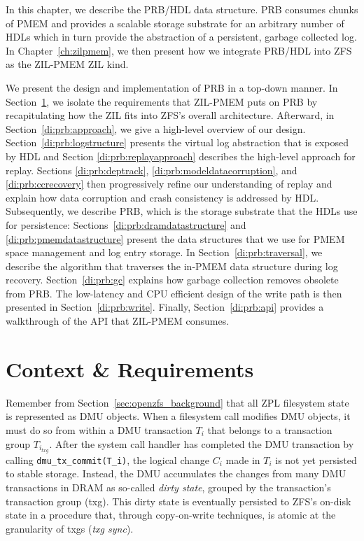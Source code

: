 \documentclass[12pt,a4paper,twoside]{book}
\begin{document}
{In this chapter, we describe the PRB/HDL data structure.
PRB consumes chunks of PMEM and provides a scalable storage substrate for an arbitrary number of HDLs which in turn provide the abstraction of a persistent, garbage collected log.
In Chapter~\ref{ch:zilpmem}, we then present how we integrate PRB/HDL into ZFS as the ZIL-PMEM ZIL kind.

We present the design and implementation of PRB in a top-down manner.
In Section~\ref{di:prb:analysis}, we isolate the requirements that ZIL-PMEM puts on PRB by recapitulating how the ZIL fits into ZFS's overall architecture.
Afterward, in Section~\ref{di:prb:approach}, we give a high-level overview of our design.
Section~\ref{di:prb:logstructure} presents the virtual log abstraction that is exposed by HDL and Section \ref{di:prb:replayapproach} describes the high-level approach for replay.
Sections \ref{di:prb:deptrack}, \ref{di:prb:modeldatacorruption}, and \ref{di:prb:ccrecovery} then progressively refine our understanding of replay and explain how data corruption and crash consistency is addressed by HDL.
Subsequently, we describe PRB, which is the storage substrate that the HDLs use for persistence:
Sections~\ref{di:prb:dramdatastructure} and \ref{di:prb:pmemdatastructure} present the data structures that we use for PMEM space management and log entry storage.
In Section~\ref{di:prb:traversal}, we describe the algorithm that traverses the in-PMEM data structure during log recovery.
Section~\ref{di:prb:gc} explains how garbage collection removes obsolete from PRB.
The low-latency and CPU efficient design of the write path is then presented in Section~\ref{di:prb:write}.
Finally, Section~\ref{di:prb:api} provides a walkthrough of the API that ZIL-PMEM consumes.

\section{Context \& Requirements}\label{di:prb:analysis}

Remember from Section~\ref{sec:openzfs_background} that all ZPL filesystem state is represented as DMU objects.
When a filesystem call modifies DMU objects, it must do so from within a DMU transaction $T_i$ that belongs to a transaction group $T_{i_{txg}}$.
After the system call handler has completed the DMU transaction by calling \lstinline{dmu_tx_commit(T_i)}, the logical change $C_i$ made in $T_i$ is not yet persisted to stable storage.
Instead, the DMU accumulates the changes from many DMU transactions in DRAM as so-called \textit{dirty state}, grouped by the transaction's transaction group (txg).
This dirty state is eventually persisted to ZFS's on-disk state in a procedure that, through copy-on-write techniques, is atomic at the granularity of txgs (\textit{txg sync}).

}
\end{document}
